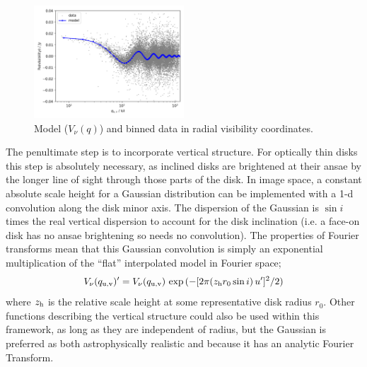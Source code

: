 \documentclass[fleqn,usenatbib]{mnras}
\begin{document}

\begin{figure}
    \centering
    \hspace{-0.5cm}\includegraphics[width=0.5\textwidth]{model.png}
    \caption{Model ($V_\nu(q)$) and binned data in radial visibility coordinates.}
    \label{fig:model}
\end{figure}

The penultimate step is to incorporate vertical structure. For optically thin disks this step is absolutely necessary, as inclined disks are brightened at their ansae by the longer line of sight through those parts of the disk. In image space, a constant absolute scale height for a Gaussian distribution can be implemented with a 1-d convolution along the disk minor axis. The dispersion of the Gaussian is $\sin i$ times the real vertical dispersion to account for the disk inclination (i.e. a face-on disk has no ansae brightening so needs no convolution). The properties of Fourier transforms mean that this Gaussian convolution is simply an exponential multiplication of the ``flat'' interpolated model in Fourier space;
\begin{equation}\label{eq:vert}
    V_\nu(q_{\rm u,v})' = V_\nu(q_{\rm u,v}) \, \exp{(-[2 \pi (z_{\rm h} r_0 \sin i) \, u']^2/2)}
\end{equation}
where $z_{\rm h}$ is the relative scale height at some representative disk radius $r_0$. Other functions describing the vertical structure could also be used within this framework, as long as they are independent of radius, but the Gaussian is preferred as both astrophysically realistic \citep[e.g.][]{2019AJ....157..135M} and because it has an analytic Fourier Transform.
\end{document}

